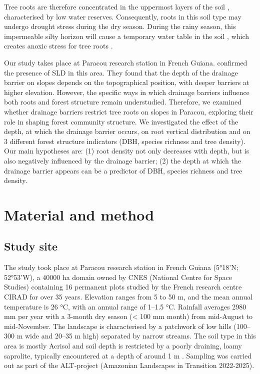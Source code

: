 \documentclass[fleqn,11pt]{latex/stylish_article} %
\begin{document}
Tree roots are therefore concentrated in the uppermost layers of the soil \citep{humbelCaracterisationParMesures1978}, characterised by low water reserves. Consequently, roots in this soil type may undergo drought stress during the dry season. During the rainy season, this impermeable silty horizon will cause a temporary water table in the soil \citep{humbelCaracterisationParMesures1978, pelissierWithinplotRelationshipsTree2002}, which creates anoxic stress for tree roots \citep{sabatierInfluenceSoilCover1997}.

Our study takes place at Paracou research station in French Guiana. \citet{epronSpatialVariationSoil2006} confirmed the presence of SLD in this area. They found that the depth of the drainage barrier on slopes depends on the topographical position, with deeper barriers at higher elevation. However, the specific ways in which drainage barriers influence both roots and forest structure remain understudied. Therefore, we examined whether drainage barriers restrict tree roots on slopes in Paracou, exploring their role in shaping forest community structure. We investigated the effect of the depth, at which the drainage barrier occurs, on root vertical distribution and on 3 different forest structure indicators (DBH, species richness and tree density). Our main hypotheses are: (1) root density not only decreases with depth, but is also negatively influenced by the drainage barrier; (2) the depth at which the drainage barrier appears can be a predictor of DBH, species richness and tree density.

\hypertarget{material-and-method}{%
\section{Material and method}\label{material-and-method}}

\hypertarget{study-site}{%
\subsection{Study site}\label{study-site}}

The study took place at Paracou research station in French Guiana (5°18'N; 52°53'W), a 40000 ha domain owned by CNES (National Centre for Space Studies) containing 16 permanent plots studied by the French research centre CIRAD for over 35 years. Elevation ranges from 5 to 50 m, and the mean annual temperature is 26 °C, with an annual range of 1--1.5 °C. Rainfall averages 2980 mm per year with a 3-month dry season (\textless{} 100 mm month) from mid-August to mid-November. The landscape is characterised by a patchwork of low hills (100--300 m wide and 20--35 m high) separated by narrow streams. The soil type in this area is mostly Acrisol \citep{iussworkinggroupwrbWorldReferenceBase2022} and soil depth is restricted by a poorly draining, loamy saprolite, typically encountered at a depth of around 1 m \citep{epronSpatialVariationSoil2006}.
Sampling was carried out as part of the ALT-project (Amazonian Landscapes in Transition 2022-2025).
\end{document}
